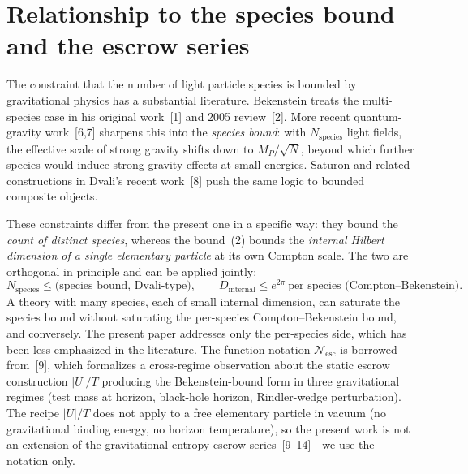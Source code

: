 \documentclass[11pt]{article}
\newcommand{\Nesc}{\mathcal{N}_{\mathrm{esc}}}
\begin{document}
\section{Relationship to the species bound and the escrow series}

The constraint that the number of light particle species is bounded by gravitational physics has a
substantial literature. Bekenstein treats the multi-species case in his original work~[1] and 2005
review~[2]. More recent quantum-gravity work~[6,7] sharpens this into the \emph{species bound}: with
$N_{\mathrm{species}}$ light fields, the effective scale of strong gravity shifts down to
$M_{P}/\sqrt{N}$, beyond which further species would induce strong-gravity effects at small energies.
Saturon and related constructions in Dvali's recent work~[8] push the same logic to bounded composite
objects.

These constraints differ from the present one in a specific way: they bound the \emph{count of
distinct species}, whereas the bound~(2) bounds the \emph{internal Hilbert dimension of a single
elementary particle} at its own Compton scale. The two are orthogonal in principle and can be applied
jointly:
\begin{equation}
  N_{\mathrm{species}} \le \text{(species bound, Dvali-type)},
  \qquad
  D_{\mathrm{internal}} \le e^{2\pi}\ \text{per species (Compton--Bekenstein)}.
\end{equation}
A theory with many species, each of small internal dimension, can saturate the species bound without
saturating the per-species Compton--Bekenstein bound, and conversely. The present paper addresses only
the per-species side, which has been less emphasized in the literature. The function notation $\Nesc$
is borrowed from~[9], which formalizes a cross-regime observation about the static escrow construction $|U|/T$ producing the Bekenstein-bound form in three gravitational regimes (test mass at horizon, black-hole horizon, Rindler-wedge perturbation). The recipe $|U|/T$ does not apply to a free elementary particle in vacuum (no gravitational binding energy, no horizon temperature), so the present work is not an extension of the gravitational entropy escrow series~[9--14]---we use the notation only.
\end{document}
